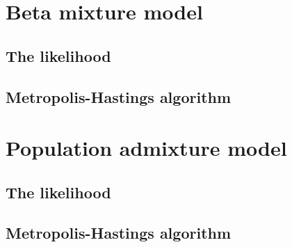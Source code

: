 \documentclass[11pt,english,letterpaper,oneside]{article}
\begin{document}
\section{Beta mixture model}

\subsection{The likelihood}

\subsection{Metropolis-Hastings algorithm}

\section{Population admixture model}

\subsection{The likelihood}

\subsection{Metropolis-Hastings algorithm}
\end{document}
